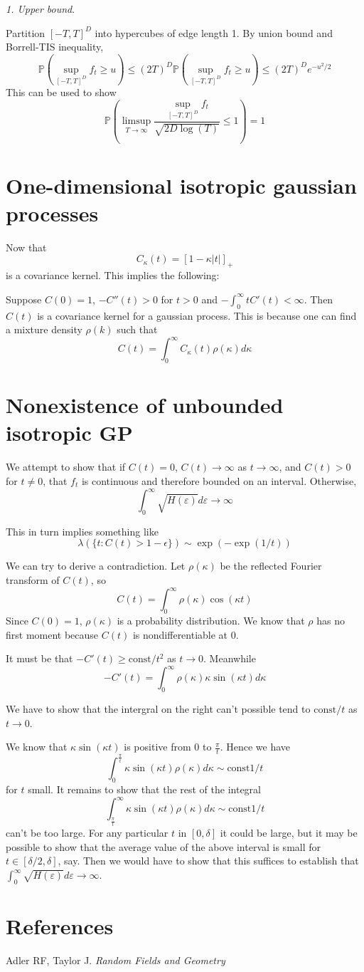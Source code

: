 \documentclass[11pt]{article}
\begin{document}
\emph{1. Upper bound}.

Partition $[-T,T]^D$ into hypercubes of edge length 1.
By union bound and Borrell-TIS inequality,
\[\mathbb{P}(\sup_{[-T,T]^D} f_t \geq u) \leq (2T)^D
\mathbb{P}(\sup_{[-T,T]^D} f_t \geq u) \leq (2T)^D e^{-u^2/2}\]
This can be used to show
\[
\mathbb{P}\left(\limsup_{T \to \infty}\frac{\sup_{[-T,T]^D}
    f_t}{\sqrt{2D\log(T)}} \leq 1
\right) = 1
\]

\section{One-dimensional isotropic gaussian processes}

Now that 
\[
C_\kappa(t) = [1-\kappa|t|]_+
\]
is a covariance kernel. This implies the following:

Suppose $C(0) = 1$, $-C''(t) > 0$ for $t > 0$ and $-\int_0^\infty t
C'(t) <\infty$.
Then $C(t)$ is a covariance kernel for a gaussian process.
This is because one can find a mixture density $\rho(k)$ such that
\[
C(t) = \int_0^\infty C_\kappa(t) \rho(\kappa) d\kappa
\]

\section{Nonexistence of unbounded isotropic GP}

We attempt to show that if $C(t) = 0$, $C(t) \to \infty$ as $t \to
\infty$, and $C(t) > 0$ for $t \neq 0$, that $f_t$ is continuous and
therefore bounded on an interval.
Otherwise,
\[
\int_0^\infty \sqrt{H(\varepsilon)} d\varepsilon \to \infty
\]

This in turn implies something like
\[
\lambda(\{t: C(t) > 1-\epsilon\}) \sim \exp(-\exp(1/t))
\]

We can try to derive a contradiction.
Let $\rho(\kappa)$ be the reflected Fourier transform of $C(t)$, so
\[
C(t) = \int_0^\infty \rho(\kappa) \cos(\kappa t)
\]
Since $C(0)=1$, $\rho(\kappa)$ is a probability distribution.
We know that $\rho$ has no first moment because $C(t)$ is
nondifferentiable at 0.

It must be that $-C'(t) \geq \text{const}/t^2$ as $t \to 0$.
Meanwhile
\[
-C'(t) = \int_0^\infty \rho(\kappa) \kappa \sin(\kappa t) d\kappa
\]

We have to show that the intergral on the right can't possible tend to
$\text{const}/t$ as $t \to 0$.

We know that $\kappa \sin(\kappa t)$ is positive from 0 to
$\frac{\pi}{t}$.
Hence we have
\[
\int_0^{\frac{\pi}{t}}\kappa \sin(\kappa t) \rho(\kappa) d\kappa \sim
\text{const} 1/t
\]
for $t$ small.
It remains to show that the rest of the integral
\[
\int_{\frac{\pi}{t}}^\infty \kappa \sin(\kappa t) \rho(\kappa) d\kappa \sim
\text{const} 1/t
\]
can't be too large. For any particular $t$ in $[0,\delta]$ it could be
large, but it may be possible to show that the average value of the
above interval is small for $t \in [\delta/2,\delta]$, say.
Then we would have to show that this suffices to establish that
$\int_0^\infty \sqrt{H(\varepsilon)} d\varepsilon \to \infty$.


\section{References}

Adler RF, Taylor J. \emph{Random Fields and Geometry}
\end{document}
